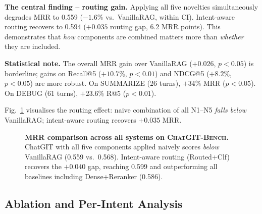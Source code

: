 \documentclass[conference]{IEEEtran}
\newcommand{\conv}{\textsc{ChatGIT-Bench}\xspace}
\begin{document}
\textbf{The central finding -- routing gain.} Applying all five novelties
simultaneously degrades MRR to 0.559 ($-1.6\%$ vs.\ VanillaRAG, within
CI). Intent-aware routing recovers to 0.594 ($+0.035$ routing gap,
6.2 MRR points). This demonstrates that \emph{how} components are
combined matters more than \emph{whether} they are included.

\textbf{Statistical note.} The overall MRR gain over VanillaRAG ($+0.026$,
$p{<}0.05$) is borderline; gains on Recall@5 ($+10.7\%$, $p{<}0.01$)
and NDCG@5 ($+8.2\%$, $p{<}0.05$) are more robust. On SUMMARIZE (26 turns),
$+34\%$ MRR ($p{<}0.05$). On DEBUG (61 turns), $+23.6\%$ R@5 ($p{<}0.01$).

Fig.~\ref{fig:mrr_bar} visualises the routing effect: naive combination
of all N1--N5 \emph{falls below} VanillaRAG; intent-aware routing recovers
$+0.035$ MRR.

\begin{figure}[t]
\centering
{}
\caption{\textbf{MRR comparison across all systems on \conv.}
ChatGIT with all five components applied naively scores \emph{below}
VanillaRAG (0.559 vs.\ 0.568). Intent-aware routing (Routed+Clf) recovers
the $+0.040$ gap, reaching 0.599 and outperforming all baselines including
Dense+Reranker (0.586).}
\label{fig:mrr_bar}
\end{figure}

\subsection{Ablation and Per-Intent Analysis}
\end{document}
